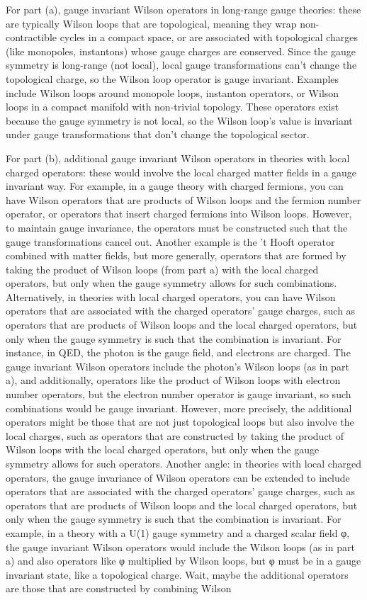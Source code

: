 For part (a), gauge invariant Wilson operators in long-range gauge theories: these are typically Wilson loops that are topological, meaning they wrap non-contractible cycles in a compact space, or are associated with topological charges (like monopoles, instantons) whose gauge charges are conserved. Since the gauge symmetry is long-range (not local), local gauge transformations can't change the topological charge, so the Wilson loop operator is gauge invariant. Examples include Wilson loops around monopole loops, instanton operators, or Wilson loops in a compact manifold with non-trivial topology. These operators exist because the gauge symmetry is not local, so the Wilson loop's value is invariant under gauge transformations that don't change the topological sector.

For part (b), additional gauge invariant Wilson operators in theories with local charged operators: these would involve the local charged matter fields in a gauge invariant way. For example, in a gauge theory with charged fermions, you can have Wilson operators that are products of Wilson loops and the fermion number operator, or operators that insert charged fermions into Wilson loops. However, to maintain gauge invariance, the operators must be constructed such that the gauge transformations cancel out. Another example is the 't Hooft operator combined with matter fields, but more generally, operators that are formed by taking the product of Wilson loops (from part a) with the local charged operators, but only when the gauge symmetry allows for such combinations. Alternatively, in theories with local charged operators, you can have Wilson operators that are associated with the charged operators' gauge charges, such as operators that are products of Wilson loops and the local charged operators, but only when the gauge symmetry is such that the combination is invariant. For instance, in QED, the photon is the gauge field, and electrons are charged. The gauge invariant Wilson operators include the photon's Wilson loops (as in part a), and additionally, operators like the product of Wilson loops with electron number operators, but the electron number operator is gauge invariant, so such combinations would be gauge invariant. However, more precisely, the additional operators might be those that are not just topological loops but also involve the local charges, such as operators that are constructed by taking the product of Wilson loops with the local charged operators, but only when the gauge symmetry allows for such operators. Another angle: in theories with local charged operators, the gauge invariance of Wilson operators can be extended to include operators that are associated with the charged operators' gauge charges, such as operators that are products of Wilson loops and the local charged operators, but only when the gauge symmetry is such that the combination is invariant. For example, in a theory with a U(1) gauge symmetry and a charged scalar field φ, the gauge invariant Wilson operators would include the Wilson loops (as in part a) and also operators like φ multiplied by Wilson loops, but φ must be in a gauge invariant state, like a topological charge. Wait, maybe the additional operators are those that are constructed by combining Wilson 